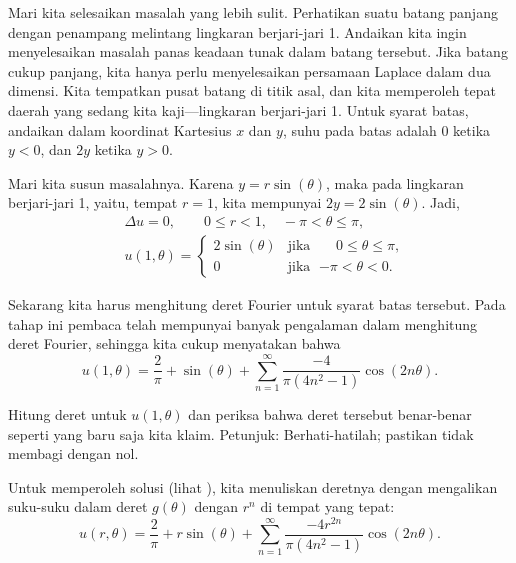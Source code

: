 \begin{example}
Mari kita selesaikan masalah yang lebih sulit.
Perhatikan suatu batang panjang
dengan penampang melintang lingkaran berjari-jari 1.  Andaikan kita ingin menyelesaikan
masalah panas keadaan tunak dalam batang tersebut.
Jika batang cukup panjang, kita hanya perlu menyelesaikan
persamaan Laplace dalam dua dimensi.  Kita tempatkan pusat batang di
titik asal, dan kita memperoleh tepat daerah yang sedang
kita kaji---lingkaran berjari-jari 1.  Untuk syarat batas, andaikan dalam
koordinat Kartesius $x$ dan
$y$, suhu pada batas adalah 0 ketika $y < 0$, dan $2y$ ketika $y > 0$.

Mari kita susun masalahnya.
Karena $y = r\sin(\theta)$, maka pada
lingkaran berjari-jari 1, yaitu, tempat $r=1$, kita mempunyai $2y = 2\sin(\theta)$.  Jadi,
\begin{align*}
& \Delta u = 0 , \qquad 0 \leq r < 1, \quad -\pi < \theta \leq \pi,\\
& u(1,\theta) = 
\begin{cases}
2\sin(\theta) & \text{jika } \; \phantom{-}0 \leq \theta \leq \pi, \\
0 & \text{jika } \; {-\pi} < \theta < 0.
\end{cases}
\end{align*}

Sekarang kita harus menghitung deret Fourier untuk syarat
batas tersebut.  Pada tahap ini pembaca telah mempunyai banyak pengalaman dalam menghitung
deret Fourier, sehingga kita cukup menyatakan bahwa 
\begin{equation*}
u(1,\theta) = 
\frac{2}{\pi}
+
\sin(\theta)
+
\sum_{n=1}^\infty \frac{-4}{\pi(4n^2-1)} \cos(2n\theta) .
\end{equation*}

\begin{exercise}
Hitung deret untuk $u(1,\theta)$ dan periksa bahwa deret tersebut benar-benar seperti
yang baru saja kita klaim.  Petunjuk: Berhati-hatilah; pastikan tidak membagi dengan nol.
\end{exercise}

Untuk memperoleh solusi (lihat ), kita
menuliskan deretnya dengan mengalikan suku-suku dalam deret $g(\theta)$
dengan $r^n$ di tempat yang tepat:
\begin{equation*}
u(r,\theta) = 
\frac{2}{\pi}
+
r\sin(\theta)
+
\sum_{n=1}^\infty \frac{-4r^{2n}}{\pi(4n^2-1)} \cos(2n\theta) .
\end{equation*}
\begin{myfig}
\capstart
{}
\caption{Solusi masalah Dirichlet dengan
data batas 0 untuk $y < 0$ dan $2y$ untuk $y > 0$.\label{dirichdisc:zero2yfig}}
\end{myfig}
\end{example}


